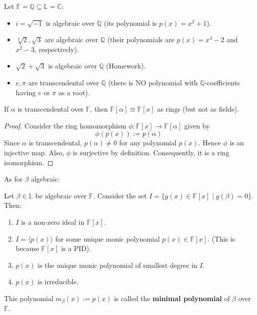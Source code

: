 \begin{example}
Let $\mathbb{F}=\mathbb{Q} \subseteq \mathbb{L}=\mathbb{C}$:
\begin{itemize}
    \item $i = \sqrt{-1}$ is algebraic over $\mathbb{Q}$ (its polynomial is $p(x) = x^2+1$).
    \item $\sqrt[4]{2}, \sqrt{3}$ are algebraic over $\mathbb{Q}$ (their polynomials are $p(x)=x^4-2$ and $x^2-3$, respectively).
    \item $\sqrt{2}+\sqrt{3}$ is algebraic over $\mathbb{Q}$ (Homework).
    \item $e, \pi$ are transcendental over $\mathbb{Q}$ (there is NO polynomial with $\mathbb{Q}$-coefficients having $e$ or $\pi$ as a root).
\end{itemize}
\end{example}

\begin{theorem}
If $\alpha$ is transcendental over $\mathbb{F}$, then $\mathbb{F}[\alpha] \cong \mathbb{F}[x]$ as rings (but not as fields).
\end{theorem}
\begin{proof}
    Consider the ring homomorphism $\phi: \mathbb{F}[x] \to \mathbb{F}[\alpha]$ given by
    $$\phi(p(x)) := p(\alpha)$$
    Since $\alpha$ is transcendental, $p(\alpha) \neq 0$ for any polynomial $p(x)$. Hence $\phi$ is an injective map. Also, $\phi$ is surjective by definition. Consequently, it is a ring isomorphism.
\end{proof}

As for $\beta$ algebraic:
\begin{proposition} \label{prop:minpoly}
Let $\beta \in \mathbb{L}$ be algebraic over $\mathbb{F}$. Consider the set $I = \{ g(x) \in \mathbb{F}[x] \mid g(\beta) = 0 \}$.
Then:
\begin{enumerate}
    \item $I$ is a non-zero ideal in $\mathbb{F}[x]$.
    \item $I = \langle p(x) \rangle$ for some unique monic polynomial $p(x) \in \mathbb{F}[x]$. (This is because $\mathbb{F}[x]$ is a PID).
    \item $p(x)$ is the unique monic polynomial of smallest degree in $I$.
    \item $p(x)$ is irreducible.
\end{enumerate}
This polynomial $m_{\beta}(x) := p(x)$ is called the \textbf{minimal polynomial} of $\beta$ over $\mathbb{F}$.
\end{proposition}

